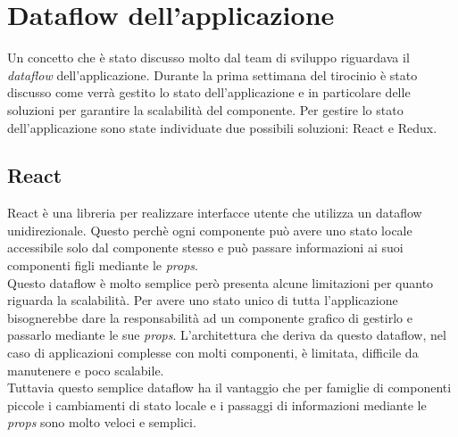 \section{Dataflow dell'applicazione}
Un concetto che è stato discusso molto dal team di sviluppo riguardava il \emph{dataflow} dell'applicazione. Durante la prima settimana del tirocinio è stato discusso come verrà gestito lo stato dell'applicazione e in particolare delle soluzioni per garantire la scalabilità del componente. Per gestire lo stato dell'applicazione sono state individuate due possibili soluzioni: React e Redux.

\subsection{React}
React è una libreria per realizzare interfacce utente che utilizza un dataflow unidirezionale. Questo perchè ogni componente può avere uno stato locale accessibile solo dal componente stesso e può passare informazioni ai suoi componenti figli mediante le \emph{props}. \\
Questo dataflow è molto semplice però presenta alcune limitazioni per quanto riguarda la scalabilità. Per avere uno stato unico di tutta l'applicazione bisognerebbe dare la responsabilità ad un componente grafico di gestirlo e passarlo mediante le sue \emph{props}. L'architettura che deriva da questo dataflow, nel caso di applicazioni complesse con molti componenti, è limitata, difficile da manutenere e poco scalabile. \\
Tuttavia questo semplice dataflow ha il vantaggio che per famiglie di componenti piccole i cambiamenti di stato locale e i passaggi di informazioni mediante le \emph{props} sono molto veloci e semplici.


